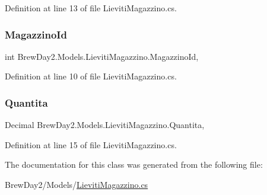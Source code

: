 Definition at line 13 of file Lieviti\+Magazzino.\+cs.

\mbox{\label{class_brew_day2_1_1_models_1_1_lieviti_magazzino_a5ca7208713c4862deb3b9a245c40fa1b}} 
\subsubsection{\texorpdfstring{Magazzino\+Id}{MagazzinoId}}
{\footnotesize\ttfamily int Brew\+Day2.\+Models.\+Lieviti\+Magazzino.\+Magazzino\+Id\hspace{0.3cm}{\ttfamily [get]}, {\ttfamily [set]}}



Definition at line 10 of file Lieviti\+Magazzino.\+cs.

\mbox{\label{class_brew_day2_1_1_models_1_1_lieviti_magazzino_ae7947ec29c47d645898ff41d434f6c24}} 
\subsubsection{\texorpdfstring{Quantita}{Quantita}}
{\footnotesize\ttfamily Decimal Brew\+Day2.\+Models.\+Lieviti\+Magazzino.\+Quantita\hspace{0.3cm}{\ttfamily [get]}, {\ttfamily [set]}}



Definition at line 15 of file Lieviti\+Magazzino.\+cs.



The documentation for this class was generated from the following file\+:\begin{DoxyCompactItemize}
\item 
Brew\+Day2/\+Models/\mbox{\hyperlink{_lieviti_magazzino_8cs}{Lieviti\+Magazzino.\+cs}}\end{DoxyCompactItemize}

